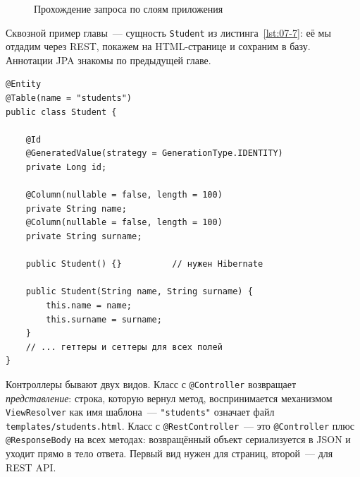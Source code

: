 \begin{figure}[htbp]\centering
{}
\caption{Прохождение запроса по слоям приложения}\label{fig:07-1}
\end{figure}

Сквозной пример главы~--- сущность \texttt{Student} из
листинга~\ref{lst:07-7}: её мы отдадим через REST, покажем на HTML-странице и
сохраним в базу. Аннотации JPA знакомы по предыдущей главе.

\begin{listing}[H]
\begin{verbatim}
@Entity
@Table(name = "students")
public class Student {

    @Id
    @GeneratedValue(strategy = GenerationType.IDENTITY)
    private Long id;

    @Column(nullable = false, length = 100)
    private String name;
    @Column(nullable = false, length = 100)
    private String surname;

    public Student() {}          // нужен Hibernate

    public Student(String name, String surname) {
        this.name = name;
        this.surname = surname;
    }
    // ... геттеры и сеттеры для всех полей
}
\end{verbatim}
\caption{Сущность Student}
\label{lst:07-7}
\end{listing}

Контроллеры бывают двух видов. Класс с \texttt{@Controller} возвращает
\emph{представление}: строка, которую вернул метод, воспринимается механизмом
\texttt{ViewResolver} как имя шаблона~--- \texttt{"students"} означает файл
\texttt{templates/students.html}. Класс с \texttt{@RestController}~--- это
\texttt{@Controller} плюс \texttt{@ResponseBody} на всех методах: возвращённый
объект сериализуется в JSON и уходит прямо в тело ответа. Первый вид нужен для
страниц, второй~--- для REST API.

